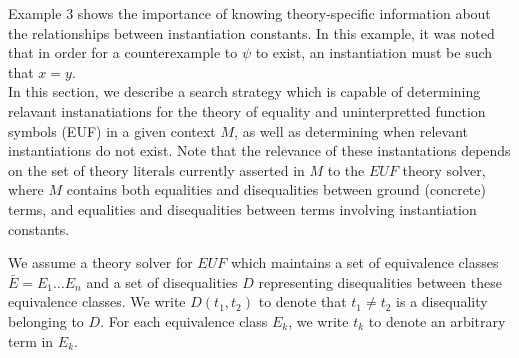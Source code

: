 \documentclass{llncs}
\begin{document}
Example 3 shows the importance of knowing theory-specific information about the relationships between instantiation constants.  
In this example, it was noted that in order for a counterexample to $\psi$ to exist, an instantiation must be such that $x = y$. \\

In this section, we describe a search strategy which is capable of determining relavant instanatiations for the theory of equality and uninterpretted function symbols (EUF) in a given context $M$, as well as determining when relevant instantiations do not exist.
Note that the relevance of these instantations depends on the set of theory literals currently asserted in $M$ to the $EUF$ theory solver, where $M$ contains both equalities and disequalities between ground (concrete) terms, and equalities and disequalities between terms involving instantiation constants.

We assume a theory solver for $EUF$ which maintains a set of equivalence classes $\bar{E} = E_1 \ldots E_n$ and a set of disequalities $D$ representing disequalities between these equivalence classes.    
We write $D( t_1, t_2 )$ to denote that $t_1 \neq t_2$ is a disequality belonging to $D$.
For each equivalence class $E_k$, we write $t_k$ to denote an arbitrary term in $E_k$.

\begin{comment}
The idea behind $Match_{EUF}$ for $\bar{e} \mapsto^I \forall \bar{x}. \varphi( \bar{x} )$ will be to show a substitution $\bar{t}/\bar{e}$ in which all deduced equalities (disequalities) $(t_1 \sim t_2)$ involving instantiation constants are such that the ground equality (disequality) $( t_1 \sim t_2 )[\bar{t}/\bar{e}]$ has also been deduced, or in other words, the equality $(t_1 \sim t_2)$ \emph{matches} with $( t_1 \sim t_2 )[\bar{t}/\bar{e}]$.
If this is the case, then we know that applying the instantiation $\bar{t}$ to $\forall \bar{x}. \varphi( \bar{x} )$ will falsify our current state, thereby causing the DPLL(T) engine to proceed.
If we find a substitution $\bar{t}/\bar{e}$ in which a suitable number of equalities and disequalities match, it may be useful to try the instantiation as well.

Otherwise, we may try to find a model $M^n$ such that all concrete ground literals are satisified and at least one literal involving instantiation constants is falsified for all values of $\bar{e}$.
If this is the case, we have shown a model $M^n$ which satisifies all ground clauses and in which a counterexample of the current form does not exist for $\forall \bar{x}. \varphi( \bar{x} )$, and we either (A) try to show that this model $M^n$ holds globally, or (B) backtrack and try another possibility for how our counterexample must look.
\end{comment}
\end{document}
